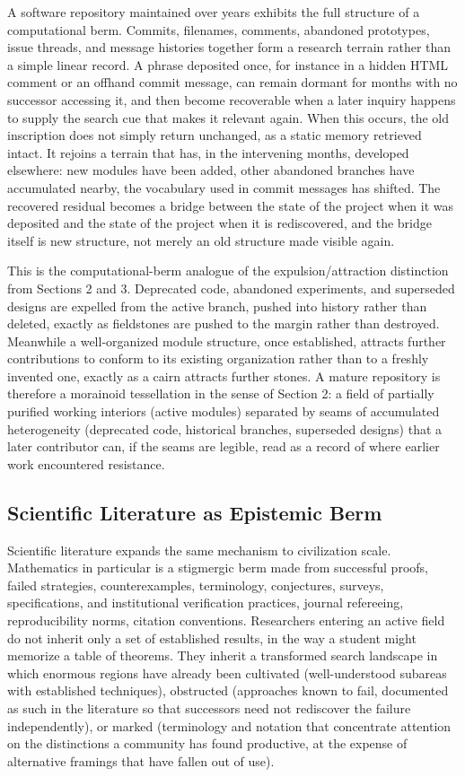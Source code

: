\documentclass[11pt]{article}
\begin{document}
A software repository maintained over years exhibits the full structure of a computational berm. Commits, filenames, comments, abandoned prototypes, issue threads, and message histories together form a research terrain rather than a simple linear record. A phrase deposited once, for instance in a hidden HTML comment or an offhand commit message, can remain dormant for months with no successor accessing it, and then become recoverable when a later inquiry happens to supply the search cue that makes it relevant again. When this occurs, the old inscription does not simply return unchanged, as a static memory retrieved intact. It rejoins a terrain that has, in the intervening months, developed elsewhere: new modules have been added, other abandoned branches have accumulated nearby, the vocabulary used in commit messages has shifted. The recovered residual becomes a bridge between the state of the project when it was deposited and the state of the project when it is rediscovered, and the bridge itself is new structure, not merely an old structure made visible again.

This is the computational-berm analogue of the expulsion/attraction distinction from Sections 2 and 3. Deprecated code, abandoned experiments, and superseded designs are expelled from the active branch, pushed into history rather than deleted, exactly as fieldstones are pushed to the margin rather than destroyed. Meanwhile a well-organized module structure, once established, attracts further contributions to conform to its existing organization rather than to a freshly invented one, exactly as a cairn attracts further stones. A mature repository is therefore a morainoid tessellation in the sense of Section 2: a field of partially purified working interiors (active modules) separated by seams of accumulated heterogeneity (deprecated code, historical branches, superseded designs) that a later contributor can, if the seams are legible, read as a record of where earlier work encountered resistance.

\subsection{Scientific Literature as Epistemic Berm}

Scientific literature expands the same mechanism to civilization scale. Mathematics in particular is a stigmergic berm made from successful proofs, failed strategies, counterexamples, terminology, conjectures, surveys, specifications, and institutional verification practices, journal refereeing, reproducibility norms, citation conventions. Researchers entering an active field do not inherit only a set of established results, in the way a student might memorize a table of theorems. They inherit a transformed search landscape in which enormous regions have already been cultivated (well-understood subareas with established techniques), obstructed (approaches known to fail, documented as such in the literature so that successors need not rediscover the failure independently), or marked (terminology and notation that concentrate attention on the distinctions a community has found productive, at the expense of alternative framings that have fallen out of use).
\end{document}
